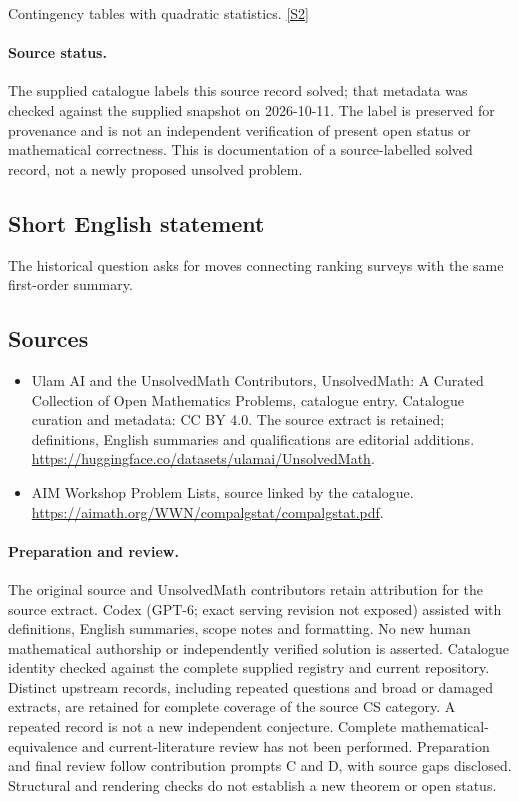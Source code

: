 \documentclass[11pt]{article}
\newcommand{\sref}[2]{\hyperlink{source:#1:#2}{[S#2]}}
\begin{document}
Contingency tables with quadratic statistics. \sref{statement}{2}
\paragraph{Source status.}
The supplied catalogue labels this source record solved; that metadata was checked against the supplied snapshot on 2026-10-11. The label is preserved for provenance and is not an independent verification of present open status or mathematical correctness. This is documentation of a source-labelled solved record, not a newly proposed unsolved problem.
\subsection{Short English statement}
The historical question asks for moves connecting ranking surveys with the same first-order summary.
\subsection{Sources}
\begin{itemize}
\item[\hypertarget{source:statement:1}{S1}] Ulam AI and the UnsolvedMath Contributors, UnsolvedMath: A Curated Collection of Open Mathematics Problems, catalogue entry. Catalogue curation and metadata: CC BY 4.0. The source extract is retained; definitions, English summaries and qualifications are editorial additions.
\url{https://huggingface.co/datasets/ulamai/UnsolvedMath}.
\item[\hypertarget{source:statement:2}{S2}] AIM Workshop Problem Lists, source linked by the catalogue.
\url{https://aimath.org/WWN/compalgstat/compalgstat.pdf}.
\end{itemize}
\paragraph{Preparation and review.}
The original source and UnsolvedMath contributors retain attribution for the source extract. Codex (GPT-6; exact serving revision not exposed) assisted with definitions, English summaries, scope notes and formatting. No new human mathematical authorship or independently verified solution is asserted. Catalogue identity checked against the complete supplied registry and current repository. Distinct upstream records, including repeated questions and broad or damaged extracts, are retained for complete coverage of the source CS category. A repeated record is not a new independent conjecture. Complete mathematical-equivalence and current-literature review has not been performed. Preparation and final review follow contribution prompts C and D, with source gaps disclosed. Structural and rendering checks do not establish a new theorem or open status.
\label{end:statement}
\end{document}

